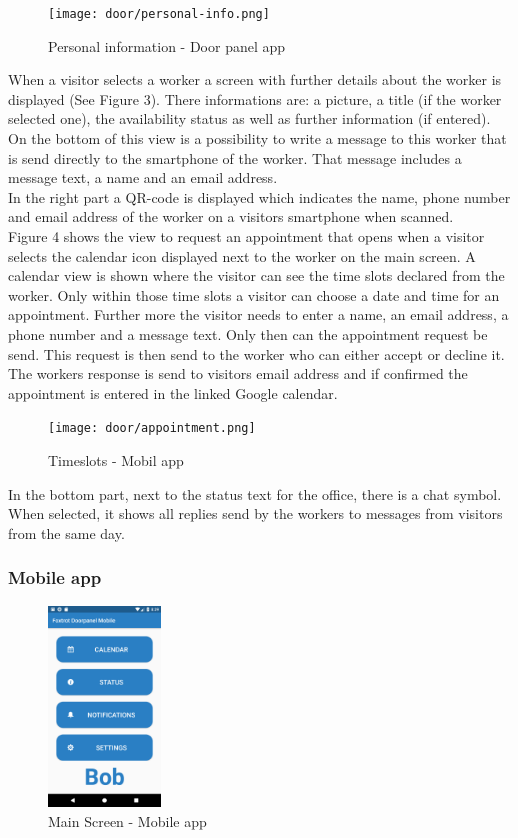\documentclass[article,colorback,accentcolor=tud4c, 11pt]{tudreport}
\begin{document}
	\begin{figure}
		\centering
		\texttt{[image: door/personal-info.png]}
		\caption{Personal information - Door panel app}
	\end{figure}	
	

When a visitor selects a worker a screen with further details about the worker is displayed (See Figure 3). There informations are: a picture, a title (if the worker selected one), the availability status as well as further information (if  entered). On the bottom of this view is a possibility to write a message to this worker that is send directly to the smartphone of the worker. That message includes a message text, a name and an email address.\\
In the right part a QR-code is displayed which indicates the name, phone number and email address of the worker on a visitors smartphone when scanned.\\

Figure 4 shows the view to request an appointment that opens when a visitor selects the calendar icon displayed next to the worker on the main screen. A calendar view is shown where the visitor can see the time slots declared from the worker. Only within those time slots a visitor can choose a date and time for an appointment. Further more the visitor needs to enter a name, an email address, a phone number and a message text. Only then can the appointment request be send.
This request is then send to the worker who can either accept or decline it. The workers response is send to visitors email address and if confirmed the appointment is entered in the linked Google calendar.\\

	\begin{figure}
		\centering
		\texttt{[image: door/appointment.png]}
		\caption{Timeslots - Mobil app}
	\end{figure}

In the bottom part, next to the status text for the office, there is a chat symbol. When selected, it shows all replies send by the workers to messages from visitors from the same day.

\subsubsection{Mobile app}

	\begin{figure}
		\centering
		\includegraphics[width=30mm,scale=0.8]{mobile/Main-Screen.png}
		\caption{Main Screen - Mobile app}
	\end{figure}
\end{document}
